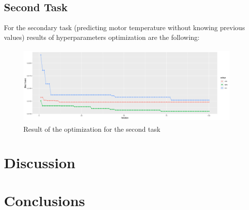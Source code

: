 \subsection{Second Task}
For the secondary task (predicting motor temperature without knowing previous values) results of hyperparameters optimization are the following:
\begin{figure}[!h]
    \centering
    \includegraphics[width=\linewidth, height=4cm]{imgs/comparison_MSE_second.png}
    \caption{Result of the optimization for the second task}
    \label{fig:second_task}
\end{figure}  

\section{Discussion}


\section{Conclusions}

